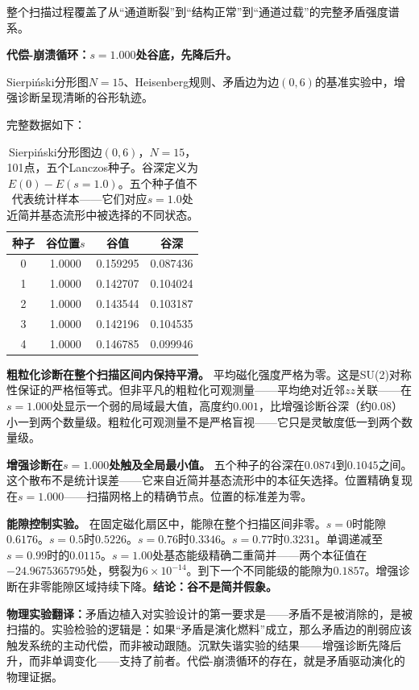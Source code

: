 \documentclass[11pt,a4paper]{book}
\theoremstyle{definition}
\begin{document}
整个扫描过程覆盖了从“通道断裂”到“结构正常”到“通道过载”的完整矛盾强度谱系。

\textbf{代偿-崩溃循环：$s=1.000$处谷底，先降后升。}

Sierpiński分形图$N=15$、Heisenberg规则、矛盾边为边$(0,6)$的基准实验中，增强诊断呈现清晰的谷形轨迹。

完整数据如下：

\begin{table}[h]
\centering
\caption{Sierpiński分形图边$(0,6)$，$N=15$，101点，五个Lanczos种子。谷深定义为$E(0)-E(s=1.0)$。五个种子值不代表统计样本——它们对应$s=1.0$处近简并基态流形中被选择的不同状态。}
\begin{tabular}{cccc}
\toprule
种子 & 谷位置$s$ & 谷值 & 谷深 \\
\midrule
0 & 1.0000 & 0.159295 & 0.087436 \\
1 & 1.0000 & 0.142707 & 0.104024 \\
2 & 1.0000 & 0.143544 & 0.103187 \\
3 & 1.0000 & 0.142196 & 0.104535 \\
4 & 1.0000 & 0.146785 & 0.099946 \\
\bottomrule
\end{tabular}
\end{table}

\textbf{粗粒化诊断在整个扫描区间内保持平滑。} 平均磁化强度严格为零。这是SU(2)对称性保证的严格恒等式。但非平凡的粗粒化可观测量——平均绝对近邻$zz$关联——在$s=1.000$处显示一个弱的局域最大值，高度约$0.001$，比增强诊断谷深（约$0.08$）小一到两个数量级。粗粒化可观测量不是严格盲视——它只是灵敏度低一到两个数量级。

\textbf{增强诊断在$s=1.000$处触及全局最小值。} 五个种子的谷深在$0.0874$到$0.1045$之间。这个散布不是统计误差——它来自近简并基态流形中的本征矢选择。位置精确复现在$s=1.000$——扫描网格上的精确节点。位置的标准差为零。

\textbf{能隙控制实验。} 在固定磁化扇区中，能隙在整个扫描区间非零。$s=0$时能隙$0.6176$。$s=0.5$时$0.5226$。$s=0.76$时$0.3346$。$s=0.77$时$0.3231$。单调递减至$s=0.99$时的$0.0115$。$s=1.00$处基态能级精确二重简并——两个本征值在$-24.9675365795$处，劈裂为$6\times10^{-14}$。到下一个不同能级的能隙为$0.1857$。增强诊断在非零能隙区域持续下降。\textbf{结论：谷不是简并假象。}

\textbf{物理实验翻译：}矛盾边植入对实验设计的第一要求是——矛盾不是被消除的，是被扫描的。实验检验的逻辑是：如果“矛盾是演化燃料”成立，那么矛盾边的削弱应该触发系统的主动代偿，而非被动跟随。沉默失谐实验的结果——增强诊断先降后升，而非单调变化——支持了前者。代偿-崩溃循环的存在，就是矛盾驱动演化的物理证据。
\end{document}
